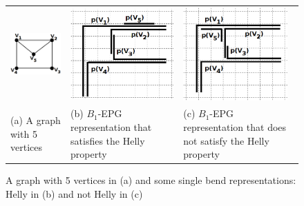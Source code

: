 \begin{figure}[h]
  \centering
  \begin{tabular}{ p{5cm} p{5cm} p{5cm} }
    \centering \includegraphics[width=3cm]{./img/envelope.png} & \includegraphics[width=4cm]{./img/envelopeHellyGradeTransparente.png} & \includegraphics[width=4cm]{./img/envelopeNaoHellyGrade.png}
    \\
    \footnotesize \centering (a) A  graph with 5 vertices & \footnotesize(b) $B_1$-EPG representation that satisfies the Helly property & \footnotesize (c) $B_1$-EPG representation that does  not satisfy the Helly property  \\


  \end{tabular}
\caption{A  graph with 5 vertices in (a) and some single bend representations: Helly in (b) and not Helly in (c)} \label{fig:envelopeRepresentacoes}
\end{figure}